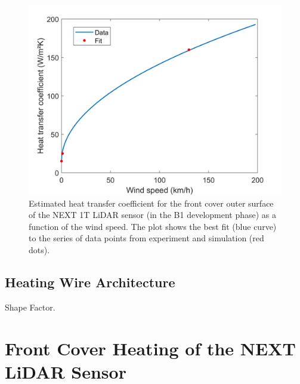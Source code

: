 \begin{figure} [H]
	\centering
	\includegraphics[scale=0.6]{Pictures/WindSpeed_Fit_Model2.png}
	\caption[Heat Transfer Coefficient vs Wind Speed]{Estimated heat transfer coefficient for the front cover outer surface of the NEXT 1T LiDAR sensor (in the B1 development phase) as a function of the wind speed. The plot shows the best fit (blue curve) to the series of data points from experiment and simulation (red dots).}
	\label{fig:HTC}
\end{figure}


%

\subsection{Heating Wire Architecture}
Shape Factor.\cite{Hahne1975}

\section{Front Cover Heating of the NEXT LiDAR Sensor}

